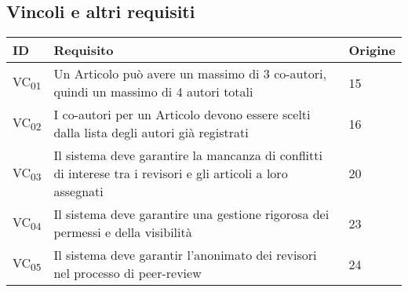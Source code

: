 \subsection{Vincoli e altri requisiti}
\label{sec:vincoli}
\begin{tabular}{|p{1cm}|p{9cm}|p{1cm}|}
  \hline
  \rowcolor{SkyBlue}
  ID & Requisito & Origine \\
  \hline
  \hline
  VC\textsubscript{01} & Un Articolo può avere un massimo di 3 co-autori, quindi un massimo di 4 autori totali & 15 \\
  \hline
  VC\textsubscript{02} &  I co-autori per un Articolo devono essere scelti dalla lista degli autori già registrati & 16 \\
  \hline
  VC\textsubscript{03} & Il sistema deve garantire la mancanza di conflitti di interese tra i revisori e gli articoli a loro assegnati & 20 \\
  \hline
  VC\textsubscript{04} & Il sistema deve garantire una gestione rigorosa dei permessi e della visibilità & 23 \\
  \hline
  VC\textsubscript{05} & Il sistema deve garantir l'anonimato dei revisori nel processo di peer-review & 24 \\
  \hline
\end{tabular}



